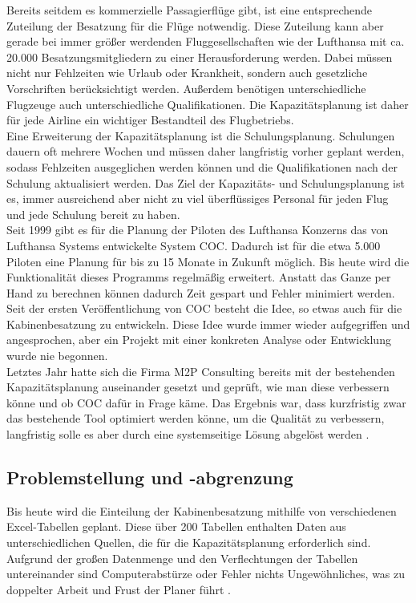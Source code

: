 \documentclass [12pt, a4paper, oneside, titlepage, ngerman]{article}
\begin{document}
Bereits seitdem es kommerzielle Passagierflüge gibt, ist eine entsprechende Zuteilung der Besatzung für die Flüge notwendig. Diese Zuteilung kann aber gerade bei immer größer werdenden Fluggesellschaften wie der Lufthansa mit ca. 20.000 Besatzungsmitgliedern zu einer Herausforderung werden. Dabei müssen nicht nur Fehlzeiten wie Urlaub oder Krankheit, sondern auch gesetzliche Vorschriften berücksichtigt werden. Außerdem benötigen unterschiedliche Flugzeuge auch unterschiedliche Qualifikationen. Die Kapazitätsplanung ist daher für jede Airline ein wichtiger Bestandteil des Flugbetriebs. \\
Eine Erweiterung der Kapazitätsplanung ist die Schulungsplanung. Schulungen dauern oft mehrere Wochen und müssen daher langfristig vorher geplant werden, sodass Fehlzeiten ausgeglichen werden können und die Qualifikationen nach der Schulung aktualisiert werden. Das Ziel der Kapazitäts- und Schulungsplanung ist es, immer ausreichend aber nicht zu viel überflüssiges Personal für jeden Flug und jede Schulung bereit zu haben. \\

\noindent Seit 1999 gibt es für die Planung der Piloten des Lufthansa Konzerns das von Lufthansa Systems entwickelte System \ac{COC}. Dadurch ist für die etwa 5.000 Piloten eine Planung für bis zu 15 Monate in Zukunft möglich. Bis heute wird die Funktionalität dieses Programms regelmäßig erweitert. Anstatt das Ganze per Hand zu berechnen können dadurch Zeit gespart und Fehler minimiert werden. \\
Seit der ersten Veröffentlichung von \ac{COC} besteht die Idee, so etwas auch für die Kabinenbesatzung zu entwickeln. Diese Idee wurde immer wieder aufgegriffen und angesprochen, aber ein Projekt mit einer konkreten Analyse oder Entwicklung wurde nie begonnen. \\

\noindent Letztes Jahr hatte sich die Firma M2P Consulting bereits mit der bestehenden Kapazitätsplanung auseinander gesetzt und geprüft, wie man diese verbessern könne und ob \ac{COC} dafür in Frage käme. Das Ergebnis war, dass kurzfristig zwar das bestehende Tool optimiert werden könne, um die Qualität zu verbessern, langfristig solle es aber durch eine systemseitige Lösung abgelöst werden \cite [S.8-10]{M2P}. %

\subsection {Problemstellung und -abgrenzung}
Bis heute wird die Einteilung der Kabinenbesatzung mithilfe von verschiedenen Excel-Tabellen geplant. Diese über 200 Tabellen enthalten Daten aus unterschiedlichen Quellen, die für die Kapazitätsplanung erforderlich sind. Aufgrund der großen Datenmenge und den Verflechtungen der Tabellen untereinander sind Computerabstürze oder Fehler nichts Ungewöhnliches, was zu doppelter Arbeit und Frust der Planer führt \cite[vgl.][]{Gespraech2}. \\ 
\end{document}
